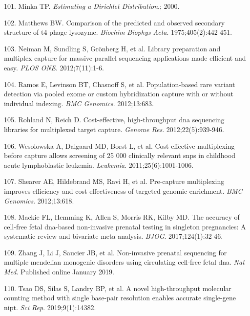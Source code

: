\documentclass[11pt,letterpaper]{book}
\begin{document}
\leavevmode\hypertarget{ref-minka:2000aa}{}%
101. Minka TP. \emph{Estimating a Dirichlet Distribution}.; 2000.

\leavevmode\hypertarget{ref-matthews:1975aa}{}%
102. Matthews BW. Comparison of the predicted and observed secondary structure of t4 phage lysozyme. \emph{Biochim Biophys Acta}. 1975;405(2):442-451.

\leavevmode\hypertarget{ref-neiman:2012aa}{}%
103. Neiman M, Sundling S, Grönberg H, et al. Library preparation and multiplex capture for massive parallel sequencing applications made efficient and easy. \emph{PLOS ONE}. 2012;7(11):1-6.

\leavevmode\hypertarget{ref-ramos:2012aa}{}%
104. Ramos E, Levinson BT, Chasnoff S, et al. Population-based rare variant detection via pooled exome or custom hybridization capture with or without individual indexing. \emph{BMC Genomics}. 2012;13:683.

\leavevmode\hypertarget{ref-rohland:2012aa}{}%
105. Rohland N, Reich D. Cost-effective, high-throughput dna sequencing libraries for multiplexed target capture. \emph{Genome Res}. 2012;22(5):939-946.

\leavevmode\hypertarget{ref-wesolowska:2011aa}{}%
106. Wesolowska A, Dalgaard MD, Borst L, et al. Cost-effective multiplexing before capture allows screening of 25 000 clinically relevant snps in childhood acute lymphoblastic leukemia. \emph{Leukemia}. 2011;25(6):1001-1006.

\leavevmode\hypertarget{ref-shearer:2012aa}{}%
107. Shearer AE, Hildebrand MS, Ravi H, et al. Pre-capture multiplexing improves efficiency and cost-effectiveness of targeted genomic enrichment. \emph{BMC Genomics}. 2012;13:618.

\leavevmode\hypertarget{ref-mackie:2017aa}{}%
108. Mackie FL, Hemming K, Allen S, Morris RK, Kilby MD. The accuracy of cell-free fetal dna-based non-invasive prenatal testing in singleton pregnancies: A systematic review and bivariate meta-analysis. \emph{BJOG}. 2017;124(1):32-46.

\leavevmode\hypertarget{ref-zhang:2019aa}{}%
109. Zhang J, Li J, Saucier JB, et al. Non-invasive prenatal sequencing for multiple mendelian monogenic disorders using circulating cell-free fetal dna. \emph{Nat Med}. Published online January 2019.

\leavevmode\hypertarget{ref-tsao:2019ab}{}%
110. Tsao DS, Silas S, Landry BP, et al. A novel high-throughput molecular counting method with single base-pair resolution enables accurate single-gene nipt. \emph{Sci Rep}. 2019;9(1):14382.
\end{document}
